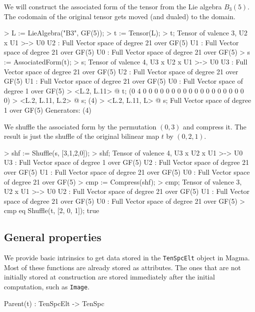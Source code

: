 \begin{example}[CompressAssocForm]

We will construct the associated form of the tensor from the Lie algebra $B_3(5)$. 
The codomain of the original tensor gets moved (and dualed) to the domain. 
\begin{code}
> L := LieAlgebra("B3", GF(5));
> t := Tensor(L); 
> t;
Tensor of valence 3, U2 x U1 >-> U0
U2 : Full Vector space of degree 21 over GF(5)
U1 : Full Vector space of degree 21 over GF(5)
U0 : Full Vector space of degree 21 over GF(5)
> s := AssociatedForm(t);
> s;
Tensor of valence 4, U3 x U2 x U1 >-> U0
U3 : Full Vector space of degree 21 over GF(5)
U2 : Full Vector space of degree 21 over GF(5)
U1 : Full Vector space of degree 21 over GF(5)
U0 : Full Vector space of degree 1 over GF(5)
> <L.2, L.11> @ t;
(0 4 0 0 0 0 0 0 0 0 0 0 0 0 0 0 0 0 0 0 0)
> <L.2, L.11, L.2> @ s;
(4)
> <L.2, L.11, L> @ s;
Full Vector space of degree 1 over GF(5)
Generators:
(4)
\end{code}

We shuffle the associated form by the permutation $(0,3)$ and compress it.
The result is just the shuffle of the original bilinear map $t$ by $(0,2,1)$.

\begin{code}
> shf := Shuffle(s, [3,1,2,0]);
> shf;
Tensor of valence 4, U3 x U2 x U1 >-> U0
U3 : Full Vector space of degree 1 over GF(5)
U2 : Full Vector space of degree 21 over GF(5)
U1 : Full Vector space of degree 21 over GF(5)
U0 : Full Vector space of degree 21 over GF(5)
> cmp := Compress(shf);
> cmp;
Tensor of valence 3, U2 x U1 >-> U0
U2 : Full Vector space of degree 21 over GF(5)
U1 : Full Vector space of degree 21 over GF(5)
U0 : Full Vector space of degree 21 over GF(5)
> cmp eq Shuffle(t, [2, 0, 1]);
true
\end{code}
\end{example}

\subsection{General properties}

We provide basic intrinsics to get data stored in the \texttt{TenSpcElt} object in Magma.
Most of these functions are already stored as attributes. 
The ones that are not initially stored at construction are stored immediately after the initial computation, such as \texttt{Image}.

\begin{intrinsics}
Parent(t) : TenSpcElt -> TenSpc
\end{intrinsics}

